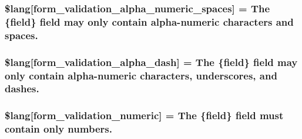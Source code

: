 \subsubsection[{\$lang}]{\setlength{\rightskip}{0pt plus 5cm}\$lang\mbox{[}\textquotesingle{}form\+\_\+validation\+\_\+alpha\+\_\+numeric\+\_\+spaces\textquotesingle{}\mbox{]} = \textquotesingle{}The \{field\} field may only contain alpha-\/numeric characters and spaces.\textquotesingle{}}\label{_admin_2system_2language_2english_2form__validation__lang_8php_a8909b4a4c25b40e7ed1a27cc5b299d90}
\hypertarget{_admin_2system_2language_2english_2form__validation__lang_8php_a95a401451435c56b9792be96ffa1bb36}{}
\subsubsection[{\$lang}]{\setlength{\rightskip}{0pt plus 5cm}\$lang\mbox{[}\textquotesingle{}form\+\_\+validation\+\_\+alpha\+\_\+dash\textquotesingle{}\mbox{]} = \textquotesingle{}The \{field\} field may only contain alpha-\/numeric characters, underscores, and dashes.\textquotesingle{}}\label{_admin_2system_2language_2english_2form__validation__lang_8php_a95a401451435c56b9792be96ffa1bb36}
\hypertarget{_admin_2system_2language_2english_2form__validation__lang_8php_abfd87d5b6c986ce3d4c0498ade54b380}{}
\subsubsection[{\$lang}]{\setlength{\rightskip}{0pt plus 5cm}\$lang\mbox{[}\textquotesingle{}form\+\_\+validation\+\_\+numeric\textquotesingle{}\mbox{]} = \textquotesingle{}The \{field\} field must contain only numbers.\textquotesingle{}}\label{_admin_2system_2language_2english_2form__validation__lang_8php_abfd87d5b6c986ce3d4c0498ade54b380}
\hypertarget{_admin_2system_2language_2english_2form__validation__lang_8php_a520425fb2cba1854c9df71d98f5645c3}{}
